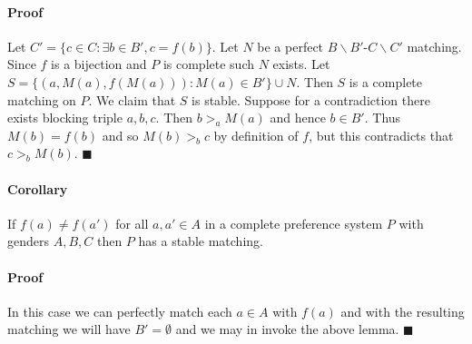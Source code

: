 \documentclass[letterpaper,12pt,oneside,onecolumn]{article}
\begin{document}
\paragraph{Proof}
Let $C' = \{ c \in C : \exists b\in B', c = f(b)\}$. Let $N$ be a perfect $B\backslash B'$-$C\backslash C'$ matching. Since $f$ is a bijection and $P$ is complete such $N$ exists. Let $S = \{ (a, M(a), f(M(a))) : M(a) \in B' \} \cup N$. Then $S$ is a complete matching on $P$. We claim that $S$ is stable. Suppose for a contradiction there exists blocking triple $a,b,c$. Then $b >_a M(a)$ and hence $b \in B'$. Thus $M(b) = f(b)$ and so $M(b) >_b c$ by definition of $f$, but this contradicts that $c >_b M(b)$. $\blacksquare$
\paragraph{Corollary}
If $f(a) \neq f(a')$ for all $a,a' \in A$ in a complete preference system $P$ with genders $A,B,C$ then $P$ has a stable matching.
\paragraph{Proof}
In this case we can perfectly match each $a \in A$ with $f(a)$ and with the resulting matching we will have $B' = \emptyset$ and we may in invoke the above lemma. $\blacksquare$
\end{document}
